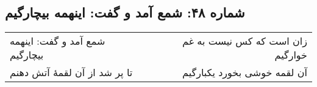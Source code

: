 \begin{center}
\section*{شماره ۴۸: شمع آمد و گفت: اینهمه بیچارگیم}
\label{sec:048}
\begin{longtable}{l p{0.5cm} r}
شمع آمد و گفت: اینهمه بیچارگیم
&&
زان است که کس نیست به غم خوارگیم
\\
تا پر شد از آن لقمهٔ آتش دهنم
&&
آن لقمه خوشی بخورد یکبارگیم
\\
\end{longtable}
\end{center}
